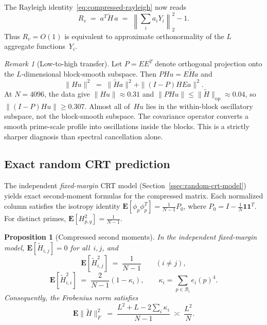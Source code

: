 \documentclass[11pt]{article}
\newtheorem{proposition}[theorem]{Proposition}
\theoremstyle{definition}
\theoremstyle{remark}
\newtheorem{remark}[theorem]{Remark}
\begin{document}
The Rayleigh identity~\eqref{eq:compressed-rayleigh}
now reads
\[
  R_v \;=\; a^T \tilde{H}\, a
  \;=\; \left\|\sum_i a_i Y_i\right\|_2^2 - 1.
\]
Thus $R_v = O(1)$ is equivalent to approximate
orthonormality of the $L$ aggregate functions~$Y_i$.

\begin{remark}[Low-to-high transfer]
\label{rem:low-to-high}
Let $P = EE^T$ denote orthogonal projection onto
the $L$-dimensional block-smooth subspace.
Then $PHu = E\tilde{H}a$ and
\begin{equation}\label{eq:low-high}
  \|Hu\|^2 \;=\;
  \|\tilde{H}a\|^2 + \|(I-P)HEa\|^2.
\end{equation}
At $N = 4096$, the data give $\|Hu\| \approx 0.31$
and $\|PHu\| \le \|\tilde{H}\|_{\mathrm{op}} \approx 0.04$,
so $\|(I-P)Hu\| \ge 0.307$.
Almost all of~$Hu$ lies in the within-block
oscillatory subspace, not the block-smooth subspace.
The covariance operator converts a smooth
prime-scale profile into oscillations inside the blocks.
This is a strictly sharper diagnosis than spectral
cancellation alone.
\end{remark}

\subsection{Exact random CRT prediction}
\label{ssec:random-crt}

The independent \emph{fixed-margin} CRT model
(Section~\ref{ssec:random-crt-model})
yields exact second-moment formulas for the
compressed matrix.
Each normalized column satisfies the isotropy identity
$\mathbf{E}[\phi_p \phi_p^T] = \frac{1}{N-1}P_0$,
where $P_0 = I - \frac{1}{N}\mathbf{1}\mathbf{1}^T$.
For distinct primes,
$\mathbf{E}[H_{p,q}^2] = \frac{1}{N-1}$.

\begin{proposition}[Compressed second moments]
\label{prop:compressed-moments}
In the independent fixed-margin model,
$\mathbf{E}[\tilde{H}_{i,j}] = 0$ for all~$i,j$, and
\begin{equation}\label{eq:cross-block-var}
  \mathbf{E}[\tilde{H}_{i,j}^2] \;=\;
  \frac{1}{N-1} \qquad (i \ne j),
\end{equation}
\begin{equation}\label{eq:diag-block-var}
  \mathbf{E}[\tilde{H}_{i,i}^2] \;=\;
  \frac{2}{N-1}(1 - \kappa_i),
  \qquad
  \kappa_i = \sum_{p \in \mathcal{B}_i} e_i(p)^4.
\end{equation}
Consequently, the Frobenius norm satisfies
\begin{equation}\label{eq:frobenius-random}
  \mathbf{E}\|\tilde{H}\|_F^2 \;=\;
  \frac{L^2 + L - 2\sum_i \kappa_i}{N-1}
  \;\asymp\; \frac{L^2}{N}.
\end{equation}
\end{proposition}
\end{document}
